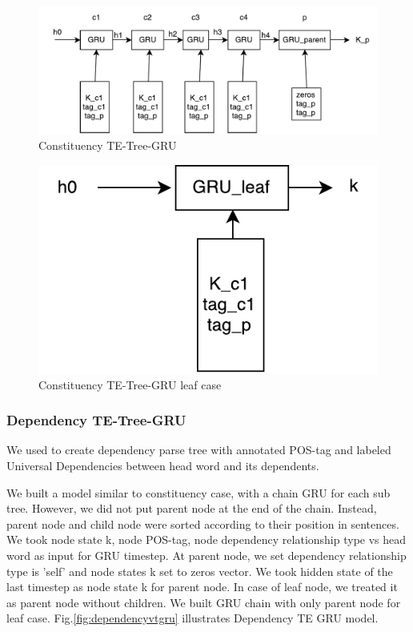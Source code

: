 \begin{figure}[H]
    \centering
    \includegraphics[width=0.9\linewidth]{figure/cvtgru}
    \caption[Constituency TE-Tree-GRU]{Constituency TE-Tree-GRU}
    \label{fig:cvtgru}
\end{figure}

\begin{figure}[H]
    \centering
    \includegraphics[width=0.4\linewidth]{figure/gruleaf}
    \caption[Constituency TE-Tree-GRU leaf case]{Constituency TE-Tree-GRU leaf case}
    \label{fig:gruleaf}
\end{figure}



\subsubsection{Dependency TE-Tree-GRU} \label{sec:VTtreeDependency}
We used \cite{manning2014stanford} to create dependency parse tree with annotated POS-tag and labeled Universal Dependencies between head word and its dependents.

We built a model similar to constituency case, with a chain GRU for each sub tree. However, we did not put parent node at the end of the chain. Instead, parent node and child node were sorted according to their position in sentences. We took node state k, node POS-tag, node dependency relationship type vs head word as input for GRU timestep. At parent node, we set dependency relationship type is 'self' and node states k set to zeros vector. We took hidden state of the last timestep as node state k for parent node. In case of leaf node, we treated it as parent node without children. We built GRU chain with only parent node for leaf case. Fig.\ref{fig:dependencyvtgru} illustrates Dependency TE GRU model.

